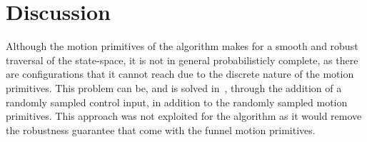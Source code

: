 \chapter{Discussion}

Although the motion primitives of the \rrtfunnel{} algorithm makes for a smooth
and robust traversal of the state-space, it is not in general probabilisticly
complete, as there are configurations that it cannot reach due to the discrete
nature of the motion primitives. This problem can be, and is solved
in~\cite{vonasekGlobalMotionPlanning2013}, through the addition of a randomly
sampled control input, in addition to the randomly sampled motion primitives.
This approach was not exploited for the \rrtfunnel{} algorithm as it would
remove the robustness guarantee that come with the funnel motion primitives.